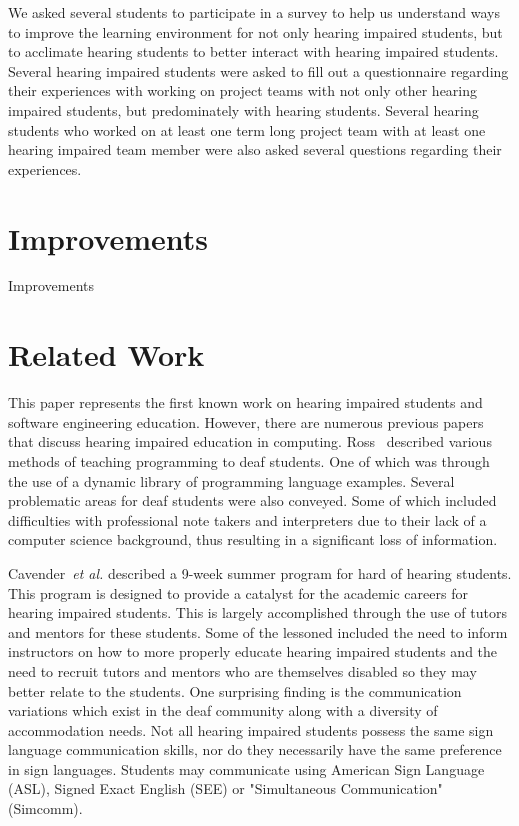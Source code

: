 \documentclass{acm_proc_article-sp}
\begin{document}
We asked several students to participate in a survey to help us understand ways to improve the learning environment for not only hearing impaired students, but to acclimate hearing students to better interact with hearing impaired students. Several hearing impaired students were asked to fill out a questionnaire regarding their experiences with working on project teams with not only other hearing impaired students, but predominately with hearing students. Several hearing students who worked on at least one term long project team with at least one hearing impaired team member were also asked several questions regarding their experiences. 








\section{Improvements}
\label{sec: improvments}

Improvements

\section{Related Work}
\label{sec: relatedwork}

This paper represents the first known work on hearing impaired students and software engineering education. However, there are numerous previous papers that discuss hearing impaired education in computing. Ross~\cite{Ross:1982:TPD:964167.964174}  described various methods of teaching programming to deaf students. One of which was through the use of a dynamic library of programming language examples. Several problematic areas for deaf students were also conveyed. Some of which included difficulties with professional note takers and interpreters due to their lack of a computer science background, thus resulting in a significant loss of information.

Cavender~\emph{et al.}\cite{Cavender:2009:SAA:1508865.1509043} described a 9-week summer program for hard of hearing students. This program is designed to provide a catalyst for the academic careers for hearing impaired students. This is largely accomplished through the use of tutors and mentors for these students. Some of the lessoned included the need to inform instructors on how to more properly educate hearing impaired students and the need to recruit tutors and mentors who are themselves disabled so they may better relate to the students. One surprising finding is the communication variations which exist in the deaf community along with a diversity of accommodation needs. Not all hearing impaired students possess the same sign language communication skills, nor do they necessarily have the same preference in sign languages. Students may communicate using American Sign Language (ASL), Signed Exact English (SEE) or "Simultaneous Communication" (Simcomm).
\end{document}

